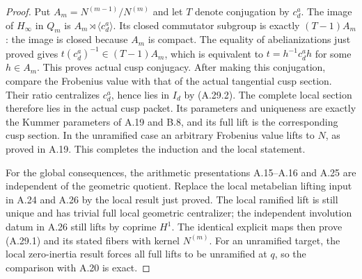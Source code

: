 \begin{proof}
Put $A_m=N^{(m-1)}/N^{(m)}$ and
let $T$ denote conjugation by $c_d^a$.
The image of $H_\infty$ in $Q_m$ is
$A_m\rtimes\langle c_d^a\rangle$.
Its closed commutator subgroup is
exactly $(T-1)A_m$: the image is
closed because $A_m$ is compact.
The equality of abelianizations just
proved gives
$t(c_d^a)^{-1}\in(T-1)A_m$, which
is equivalent to
$t=h^{-1}c_d^a h$ for some $h\in A_m$.
This proves actual cusp conjugacy.
After making this conjugation,
compare the Frobenius value with
that of the actual tangential cusp
section. Their ratio centralizes
$c_d^a$, hence lies in $I_d$ by
(A.29.2). The complete local section
therefore lies in the actual cusp
packet. Its parameters and uniqueness
are exactly the Kummer parameters of
A.19 and B.8, and its full lift is
the corresponding cusp section.
In the unramified case an arbitrary
Frobenius value lifts to $N$, as
proved in A.19. This completes
the induction and the local statement.

For the global consequences, the
arithmetic presentations A.15--A.16
and A.25 are independent of the
geometric quotient. Replace the
local metabelian lifting input in
A.24 and A.26 by the local result
just proved. The local ramified
lift is still unique and has trivial
full local geometric centralizer;
the independent involution datum
in A.26 still lifts by coprime
$H^1$. The identical explicit maps
then prove (A.29.1) and its stated
fibers with kernel $N^{(m)}$.
For an unramified target, the local
zero-inertia result forces all full
lifts to be unramified at $q$, so
the comparison with A.20 is exact.
\end{proof}

